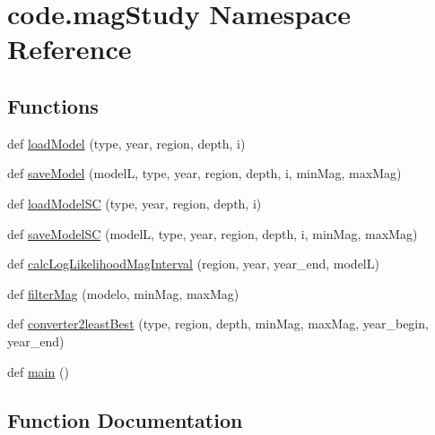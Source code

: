 \hypertarget{namespacecode_1_1mag_study}{}\section{code.\+mag\+Study Namespace Reference}
\label{namespacecode_1_1mag_study}
\subsection*{Functions}
\begin{DoxyCompactItemize}
\item 
def \hyperlink{namespacecode_1_1mag_study_a15d2acf7101a98a829fc088787094a3d}{load\+Model} (type, year, region, depth, i)
\item 
def \hyperlink{namespacecode_1_1mag_study_a7eaa239d05a272f0fc379d3c1b6abf7b}{save\+Model} (modelL, type, year, region, depth, i, min\+Mag, max\+Mag)
\item 
def \hyperlink{namespacecode_1_1mag_study_a6120f1fb76fd993f6e67c95d06e50327}{load\+Model\+SC} (type, year, region, depth, i)
\item 
def \hyperlink{namespacecode_1_1mag_study_a35b81b17517bc7bb23a6a412ed84b1e1}{save\+Model\+SC} (modelL, type, year, region, depth, i, min\+Mag, max\+Mag)
\item 
def \hyperlink{namespacecode_1_1mag_study_a8df21ce4d2374033bf6762d108ceaf03}{calc\+Log\+Likelihood\+Mag\+Interval} (region, year, year\+\_\+end, modelL)
\item 
def \hyperlink{namespacecode_1_1mag_study_a0419754de8467346b760c016ff46293f}{filter\+Mag} (modelo, min\+Mag, max\+Mag)
\item 
def \hyperlink{namespacecode_1_1mag_study_a43dce4cb5ac4f0c4ff997b2f41b74616}{converter2least\+Best} (type, region, depth, min\+Mag, max\+Mag, year\+\_\+begin, year\+\_\+end)
\item 
def \hyperlink{namespacecode_1_1mag_study_a7e733f07b89cef9d42b1517cef4203f1}{main} ()
\end{DoxyCompactItemize}


\subsection{Function Documentation}
\mbox{\label{namespacecode_1_1mag_study_a8df21ce4d2374033bf6762d108ceaf03}} 
